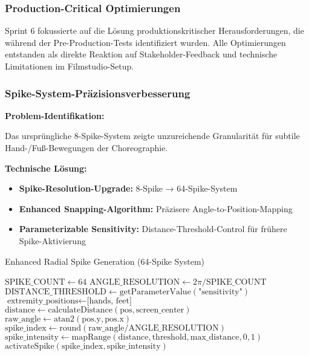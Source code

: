\subsubsection{Production-Critical Optimierungen}

Sprint 6 fokussierte auf die Lösung produktionskritischer Herausforderungen, die während der Pre-Production-Tests identifiziert wurden. Alle Optimierungen entstanden als direkte Reaktion auf Stakeholder-Feedback und technische Limitationen im Filmstudio-Setup.

\subsubsection{Spike-System-Präzisionsverbesserung}

\textbf{Problem-Identifikation:}
\raggedright Das ursprüngliche 8-Spike-System zeigte unzureichende Granularität für subtile Hand-/Fuß-Bewegungen der Choreographie.

\textbf{Technische Lösung:}
\begin{itemize}
    \item \textbf{Spike-Resolution-Upgrade:} 8-Spike → 64-Spike-System
    \item \textbf{Enhanced Snapping-Algorithm:} Präzisere Angle-to-Position-Mapping
    \item \textbf{Parameterizable Sensitivity:} Distance-Threshold-Control für frühere Spike-Aktivierung
\end{itemize}

\begin{algorithm}[H]
\caption{Enhanced Radial Spike Generation (64-Spike System)}\label{alg:enhanced_spike}
\begin{algorithmic}[1]
    \State $\text{SPIKE\_COUNT} \leftarrow 64$
    \State $\text{ANGLE\_RESOLUTION} \leftarrow 2\pi / \text{SPIKE\_COUNT}$
    \State $\text{DISTANCE\_THRESHOLD} \leftarrow \text{getParameterValue}(\text{"sensitivity"})$
    \State $\text{extremity\_positions} \leftarrow \text{[hands, feet]}$
        \State $\text{distance} \leftarrow \text{calculateDistance}(\text{pos}, \text{screen\_center})$
            \State $\text{raw\_angle} \leftarrow \text{atan2}(\text{pos.y}, \text{pos.x})$
            \State $\text{spike\_index} \leftarrow \text{round}(\text{raw\_angle} / \text{ANGLE\_RESOLUTION})$
            \State $\text{spike\_intensity} \leftarrow \text{mapRange}(\text{distance}, \text{threshold}, \text{max\_distance}, 0, 1)$
            \State $\text{activateSpike}(\text{spike\_index}, \text{spike\_intensity})$
        \EndIf
    \EndFor
\end{algorithmic}
\end{algorithm}

